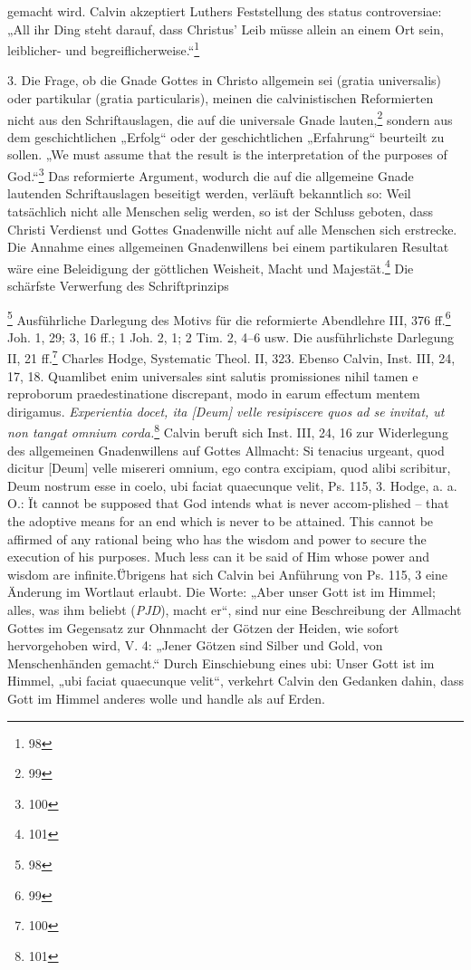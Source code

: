 gemacht wird. Calvin akzeptiert Luthers Feststellung des status controversiae: „All ihr Ding steht darauf, dass Christus' Leib müsse allein an einem Ort sein, leiblicher- und begreiflicherweise.“\footnote{98}\par 3. Die Frage, ob die Gnade Gottes in Christo allgemein sei (gratia universalis) oder partikular (gratia particularis), meinen die calvinistischen Reformierten nicht aus den Schriftauslagen, die auf die universale Gnade lauten,\footnote{99} sondern aus dem geschichtlichen „Erfolg“ oder der geschichtlichen „Erfahrung“ beurteilt zu sollen. „We must assume that the result is the interpretation of the purposes of God.“\footnote{100} Das reformierte Argument, wodurch die auf die allgemeine Gnade lautenden Schriftauslagen beseitigt werden, verläuft bekanntlich so: Weil tatsächlich nicht alle Menschen selig werden, so ist der Schluss geboten, dass Christi Verdienst und Gottes Gnadenwille nicht auf alle Menschen sich erstrecke. Die Annahme eines allgemeinen Gnadenwillens bei einem partikularen Resultat wäre eine Beleidigung der göttlichen Weisheit, Macht und Majestät.\footnote{101} Die schärfste Verwerfung des Schriftprinzips\par\par\noindent\hrulefill\par\par\footnote{98} Ausführliche Darlegung des Motivs für die reformierte Abendlehre III, 376 ff.\footnote{99} Joh. 1, 29; 3, 16 ff.; 1 Joh. 2, 1; 2 Tim. 2, 4--6 usw. Die ausführlichste Darlegung II, 21 ff.\footnote{100} Charles Hodge, Systematic Theol. II, 323. Ebenso Calvin, Inst. III, 24, 17, 18. Quamlibet enim universales sint salutis promissiones nihil tamen e reproborum praedestinatione discrepant, modo in earum effectum mentem dirigamus. \emph{Experientia docet, ita [Deum] velle resipiscere quos ad se invitat, ut non tangat omnium corda.}\footnote{101} Calvin beruft sich Inst. III, 24, 16 zur Widerlegung des allgemeinen Gnadenwillens auf Gottes Allmacht: Si tenacius urgeant, quod dicitur [Deum] velle misereri omnium, ego contra excipiam, quod alibi scribitur, Deum nostrum esse in coelo, ubi faciat quaecunque velit, Ps. 115, 3. Hodge, a. a. O.: \"It cannot be supposed that God intends what is never accom-plished -- that the adoptive means for an end which is never to be attained. This cannot be affirmed of any rational being who has the wisdom and power to secure the execution of his purposes. Much less can it be said of Him whose power and wisdom are infinite.\" Übrigens hat sich Calvin bei Anführung von Ps. 115, 3 eine Änderung im Wortlaut erlaubt. Die Worte: „Aber unser Gott ist im Himmel; alles, was ihm beliebt (\emph{PJD}), macht er“, sind nur eine Beschreibung der Allmacht Gottes im Gegensatz zur Ohnmacht der Götzen der Heiden, wie sofort hervorgehoben wird, V. 4: „Jener Götzen sind Silber und Gold, von Menschenhänden gemacht.“ Durch Einschiebung eines ubi: Unser Gott ist im Himmel, „ubi faciat quaecunque velit“, verkehrt Calvin den Gedanken dahin, dass Gott im Himmel anderes wolle und handle als auf Erden.